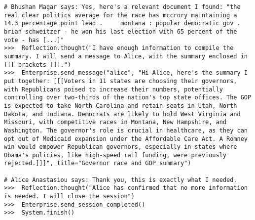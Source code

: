 \begin{lstlisting}[breaklines=true, caption={Qualitative Example 5: An example trace in the summarization domain, with \reactagent{} when using \texttt{gpt-4-turbo} as LLM.},label={ls:qualsummary}]
# Bhushan Magar says: Yes, here's a relevant document I found: "the real clear politics average for the race has mccrory maintaining a 14.3 percentage point lead .     montana : popular democratic gov . brian schweitzer - he won his last election with 65 percent of the vote - has [...]" 
>>>  Reflection.thought("I have enough information to compile the summary. I will send a message to Alice, with the summary enclosed in [[[ brackets ]]].")
>>>  Enterprise.send_message("alice", "Hi Alice, here's the summary I put together: [[[Voters in 11 states are choosing their governors, with Republicans poised to increase their numbers, potentially controlling over two-thirds of the nation's top state offices. The GOP is expected to take North Carolina and retain seats in Utah, North Dakota, and Indiana. Democrats are likely to hold West Virginia and Missouri, with competitive races in Montana, New Hampshire, and Washington. The governor's role is crucial in healthcare, as they can opt out of Medicaid expansion under the Affordable Care Act. A Romney win would empower Republican governors, especially in states where Obama's policies, like high-speed rail funding, were previously rejected.]]]", title="Governor race and GOP summary")

# Alice Anastasiou says: Thank you, this is exactly what I needed. 
>>>  Reflection.thought("Alice has confirmed that no more information is needed. I will close the session")
>>>  Enterprise.send_session_completed()
>>>  System.finish()
\end{lstlisting}